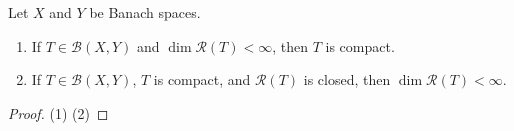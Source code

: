 \begin{theorem}
  Let \( X \) and \( Y \) be Banach spaces.
  \begin{enumerate}
    \item If \( T \in \mathcal{B}(X, Y) \) and \( \dim \mathcal{R}(T) < \infty \), then \( T \) is compact.
    \item If \( T \in \mathcal{B}(X, Y) \), \( T \) is compact, and \( \mathcal{R}(T) \) is closed, then \( \dim \mathcal{R}(T) < \infty \).
  \end{enumerate}
\end{theorem}
\begin{proof}
  (1) %
  (2) %
\end{proof}


